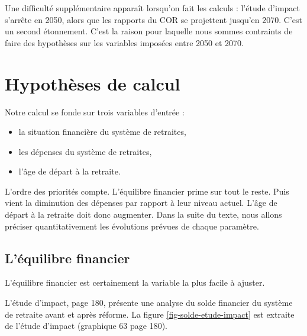 \documentclass[10pt]{article}
\begin{document}
Une difficulté supplémentaire apparaît lorsqu'on fait les calculs : 
l'étude d'impact s'arrête en 2050, alors que les rapports du COR 
se projettent jusqu'en 2070. 
C'est un second étonnement. 
C'est la raison pour laquelle nous sommes contraints de faire des 
hypothèses sur les variables imposées entre 2050 et 2070. 


\section{Hypothèses de calcul}

Notre calcul se fonde sur trois variables d'entrée :
\begin{itemize}
\item la situation financière du système de retraites, 
\item les dépenses du système de retraites, 
\item l'âge de départ à la retraite. 
\end{itemize}

L'ordre des priorités compte. 
L'équilibre financier prime sur tout le reste. 
Puis vient la diminution des dépenses par rapport à leur niveau actuel. 
L'âge de départ à la retraite doit donc augmenter. 
Dans la suite du texte, nous allons préciser quantitativement 
les évolutions prévues de chaque paramètre. 


\subsection{L'équilibre financier}

L'équilibre financier est certainement la variable 
la plus facile à ajuster. 

L'étude d'impact, page 180, présente une analyse du solde financier du système de retraite 
avant et après réforme.
La figure \ref{fig-solde-etude-impact} est extraite de l'étude d'impact 
(graphique 63 page 180). 
\end{document}
